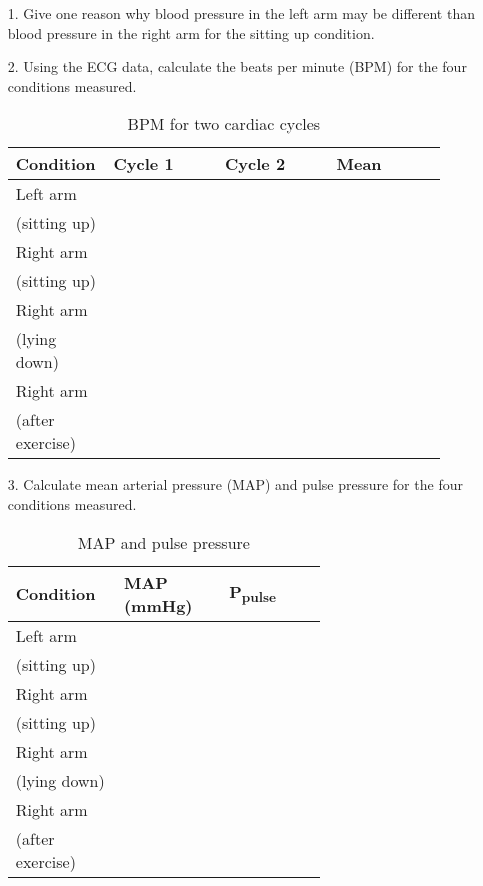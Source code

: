 \documentclass{article}
\begin{document}
\begin{itemize}
	\item[1.] Give one reason why blood pressure in the left arm may be different than blood pressure in the right arm for the sitting up condition.\pagebreak
	\item[2.] Using the ECG data, calculate the beats per minute (BPM) for the four conditions measured.
	
	\begin{table}[h]
	\centering
	\caption{BPM for two cardiac cycles}
	\begin{tabular}[h!]{p{0.15\linewidth}|p{0.25\linewidth}p{0.25\linewidth}p{0.25\linewidth}}
	\toprule
	Condition & Cycle 1 & Cycle 2 & Mean\\
	\midrule
	Left arm & & &\\(sitting up) & & &\\\midrule
	Right arm & & &\\(sitting up) & & &\\\midrule
	Right arm & & &\\(lying down) & & &\\\midrule
	Right arm & & &\\(after exercise) & & &\\
	\bottomrule
	\end{tabular}
	\end{table}\vspace{0cm}
	
	\item[3.] Calculate mean arterial pressure (MAP) and pulse pressure for the four conditions measured.
	
	\begin{table}[h]
	\centering
	\caption{MAP and pulse pressure}
	\begin{tabular}[h!]{p{0.15\linewidth}|p{0.25\linewidth}p{0.25\linewidth}}
	\toprule
	Condition & MAP (mmHg) & P\textsubscript{pulse}\\
	\midrule
	Left arm & & \\(sitting up) & & \\\midrule
	Right arm & & \\(sitting up) & & \\\midrule
	Right arm & & \\(lying down) & & \\\midrule
	Right arm & & \\(after exercise) & & \\
	\bottomrule
	\end{tabular}
	\end{table}\vspace{0cm}
	

\end{itemize}
\end{document}
